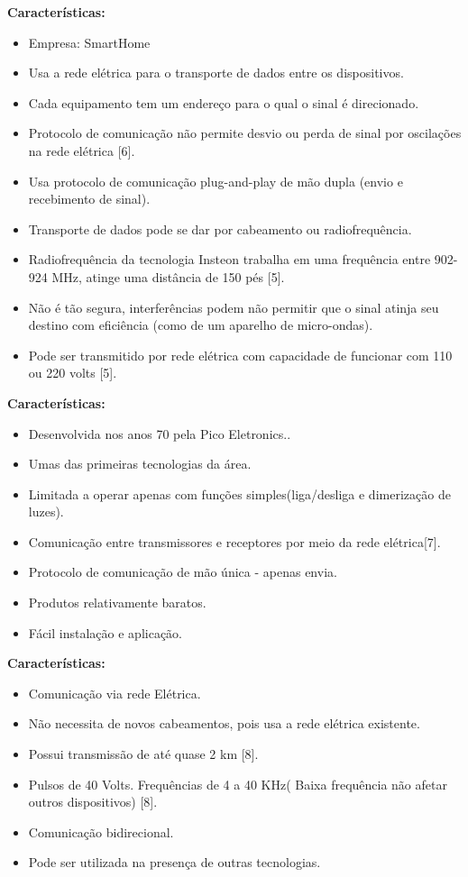 \textbf{Características:}
\begin{itemize}
\item Empresa: SmartHome
\item Usa a rede elétrica para o transporte de dados entre os dispositivos.
\item Cada equipamento tem um endereço para o qual o sinal é direcionado.
\item Protocolo de comunicação não permite desvio ou perda de sinal por oscilações na rede elétrica [6].
\item Usa protocolo de comunicação plug-and-play de mão dupla (envio e recebimento de sinal).
\item Transporte de dados pode se dar por cabeamento ou radiofrequência.
\item Radiofrequência da tecnologia Insteon trabalha em uma frequência entre 902-924 MHz, atinge uma distância de 150 pés [5].
\item Não é tão segura, interferências podem não permitir que o sinal atinja seu destino com eficiência (como de um aparelho de micro-ondas).
\item Pode ser transmitido por rede elétrica com capacidade de funcionar com 110 ou 220 volts [5].
\end{itemize}

\textbf{Características:}
\begin{itemize}
\item Desenvolvida nos anos 70 pela Pico Eletronics..
\item Umas das primeiras tecnologias da área.
\item Limitada a operar apenas com funções simples(liga/desliga e dimerização de luzes).
\item Comunicação entre transmissores e receptores por meio da rede elétrica[7].
\item Protocolo de comunicação de mão única - apenas envia.
\item Produtos relativamente baratos.
\item Fácil instalação e aplicação.
\end{itemize}

\textbf{Características:}
\begin{itemize}
\item Comunicação via rede Elétrica.
\item Não necessita de novos cabeamentos, pois usa a rede elétrica existente.  
\item Possui transmissão de até quase 2 km [8].
\item Pulsos de 40 Volts. Frequências de 4 a 40 KHz( Baixa frequência não afetar outros dispositivos) [8].
\item Comunicação bidirecional.
\item Pode ser utilizada na presença de outras tecnologias.
\end{itemize}

